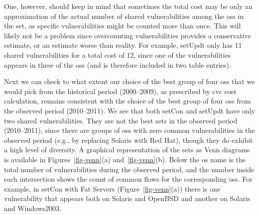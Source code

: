 One, however, should keep in mind that sometimes the total cost may be only an approximation of the actual number of shared vulnerabilities among the \glspl{os} in the set, as specific vulnerabilities might be counted more than once. 
This will likely not be a problem since overcounting vulnerabilities provides a conservative estimate, or an estimate worse than reality. 
For example, setUpdt only has 11 shared vulnerabilities for a total cost of 12, since one of the vulnerabilities appears in three of the \glspl{os} (and is therefore included in two table entries).

Next we can check to what extent our choice of the best group of four \glspl{os} that we would pick from the historical period (2000--2009), as prescribed by \gls{cvc} cost calculation, remains consistent with the choice of the best group of four \glspl{os} from the observed period (2010--2011). 
We see that both setCon and setUpdt have only two shared vulnerabilities. 
They are not the best sets in the observed period (2010--2011), since there are groups of \glspl{os} with zero common vulnerabilities in the observed period (e.g., by replacing Solaris with Red Hat), though they do exhibit a high level of diversity. 
A graphical representation of the sets as Venn diagrams is available in Figures~\ref{fig-venn}(a) and~\ref{fig-venn}(b). 
Below the \gls{os} name is the total number of vulnerabilities during the observed period, and the number inside each intersection shows the count of common flaws for the corresponding \glspl{os}. 
For example, in setCon with Fat Servers (Figure~\ref{fig-venn}(a)) there is one vulnerability that appears both on Solaris and OpenBSD and another on Solaris and Windows2003.


